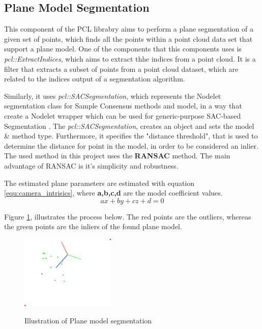 \documentclass[12pt]{report}
\begin{document}
\subsection{Plane Model Segmentation}
This component of the PCL librabry aims to perform a plane segmentation of a given set of points, which finds all the points within a point cloud data set that support a plane model.
One of the components that this components uses is \textit{pcl::ExtractIndices}, which aims to extract thhe indices from a point cloud.
It is a filter that extracts a subset of points from a point cloud dataset, which are related to the indices output of a segmentation algorithm.

Similarly, it uses \textit{pcl::SACSegmentation}, which represents the Nodelet segmentation class for Sample Consensus methods and model, in a way that create a Nodelet wrapper which can be used
for generic-purpose SAC-based Segmentation .
The \textit{pcl::SACSegmentation}, creates an object and sets the model \& method type. Furthermore, it specifies the "distance threshold", that is used to determine the distance for point in the model, in order to be considered an inlier.
The used method in this project uses the \textbf{RANSAC} method. The main advantage of RANSAC is it's simplicity and robustness. 

The estimated plane parameters are estimated with equation \ref{equ:camera_intrisics}, where \textbf{a,b,c,d} are the model coefficient values.
\begin{equation}
  ax + by + cz + d = 0
\end{equation}
\label{equ:plane_param}

Figure \ref{fig:plane_seg}, illustrates the process below. The red points are the outliers, whereas the green points are the inliers of the found plane model.

\begin{figure}[H]%
  \centering
  \includegraphics[width=0.4\textwidth]{planar_segmentation_2.png}
 \caption{Illustration of Plane model segmentation}\cite[]{SHCHUROVA201576}
 \label{fig:plane_seg} 
\end{figure}
\end{document}
